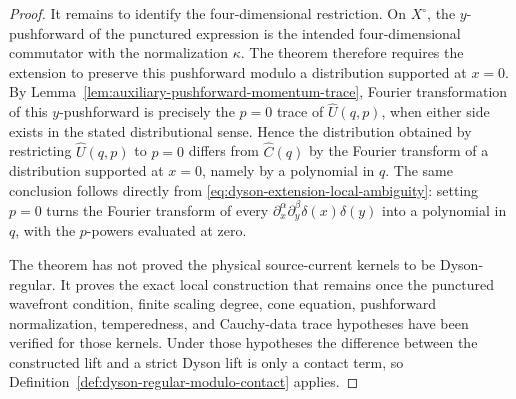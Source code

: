 \begin{proof}
It remains to identify the four-dimensional restriction.  On
\(X^\circ\), the \(y\)-pushforward of the punctured expression is the intended
four-dimensional commutator with the normalization \(\kappa\).  The theorem
therefore requires the extension to preserve this pushforward modulo a
distribution supported at \(x=0\).  By
Lemma~\ref{lem:auxiliary-pushforward-momentum-trace}, Fourier
transformation of this \(y\)-pushforward is precisely the \(p=0\) trace of
\(\widehat U(q,p)\), when either side exists in the stated distributional
sense.  Hence the distribution obtained by restricting \(\widehat U(q,p)\)
to \(p=0\) differs from \(\widehat C(q)\) by the Fourier transform of a
distribution supported at \(x=0\), namely by a polynomial in \(q\).  The same
conclusion follows directly from
\eqref{eq:dyson-extension-local-ambiguity}: setting \(p=0\) turns the
Fourier transform of every
\(\partial_x^\alpha\partial_y^\beta\delta(x)\delta(y)\) into a polynomial in
\(q\), with the \(p\)-powers evaluated at zero.

The theorem has not proved the physical source-current kernels to be
Dyson-regular.  It proves the exact local construction that remains once the
punctured wavefront condition, finite scaling degree, cone equation,
pushforward normalization, temperedness, and Cauchy-data trace hypotheses
have been verified for those kernels.  Under those hypotheses the difference
between the constructed lift and a strict Dyson lift is only a contact term,
so
Definition~\ref{def:dyson-regular-modulo-contact} applies.
\end{proof}

